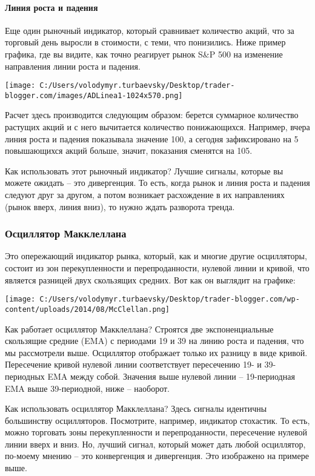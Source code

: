 \documentclass[a5paper]{article}
\begin{document}
\paragraph{Линия роста и падения}

Еще один рыночный индикатор, который сравнивает количество акций, что за торговый день выросли в стоимости, с теми, что понизились. Ниже пример графика, где вы видите, как точно реагирует рынок S\&P 500 на изменение направления линии роста и падения.

\texttt{[image: C:/Users/volodymyr.turbaevsky/Desktop/trader-blogger.com/images/ADLinea1-1024x570.png]}

Расчет здесь производится следующим образом: берется суммарное количество растущих акций и с него вычитается количество понижающихся. Например, вчера линия роста и падения показывала значение 100, а сегодня зафиксировано на 5 повышающихся акций больше, значит, показания сменятся на 105.

Как использовать этот рыночный индикатор? Лучшие сигналы, которые вы
можете ожидать – это дивергенция. То есть, когда рынок и линия роста и
падения следуют друг за другом, а потом возникает расхождение в их
направлениях (рынок вверх, линия вниз), то нужно ждать разворота
тренда.

\subsubsection{Осциллятор Макклеллана}

Это опережающий индикатор рынка, который, как и многие другие осцилляторы, состоит из зон перекупленности и перепроданности, нулевой линии и кривой, что является разницей двух скользящих средних. Вот как он выглядит на графике:

\texttt{[image: C:/Users/volodymyr.turbaevsky/Desktop/trader-blogger.com/wp-content/uploads/2014/08/McClellan.png]}

Как работает осциллятор Макклеллана? Строятся две экспоненциальные скользящие средние (EMA) с периодами 19 и 39 на линию роста и падения, что мы рассмотрели выше. Осциллятор отображает только их разницу в виде кривой. Пересечение кривой нулевой линии соответствует пересечению 19- и 39-периодных EMA между собой. Значения выше нулевой линии – 19-периодная EMA выше 39-периодной, ниже – наоборот.

Как использовать осциллятор Макклеллана? Здесь сигналы идентичны
большинству осцилляторов. Посмотрите, например, индикатор
стохастик. То есть, можно торговать зоны перекупленности и
перепроданности, пересечение нулевой линии вверх и вниз. Но, лучший
сигнал, который может дать любой осциллятор, по-моему мнению – это
конвергенция и дивергенция. Это изображено на примере выше.
\end{document}
